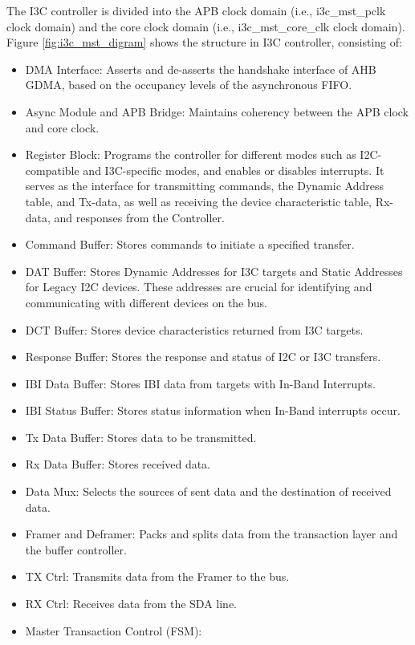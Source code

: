 \documentclass[main\_\_EN.tex]{subfiles}
\begin{document}
The I3C controller is divided into the APB clock domain (i.e., i3c\_mst\_pclk clock domain) and the core clock domain (i.e., i3c\_mst\_core\_clk clock domain). Figure \ref{fig:i3c_mst_digram} shows the structure in \chipname{} I3C controller, consisting of:

\begin{itemize}
    \item DMA Interface: Asserts and de-asserts the handshake interface of AHB GDMA, based on the occupancy levels of the asynchronous FIFO.
    \item Async Module and APB Bridge: Maintains coherency between the APB clock and core clock.
    \item Register Block: Programs the controller for different modes such as I2C-compatible and I3C-specific modes, and enables or disables interrupts. It serves as the interface for transmitting commands, the Dynamic Address table, and Tx-data, as well as receiving the device characteristic table, Rx-data, and responses from the Controller.
    \item Command Buffer: Stores commands to initiate a specified transfer.
    \item DAT Buffer: Stores Dynamic Addresses for I3C targets and Static Addresses for Legacy I2C devices. These addresses are crucial for identifying and communicating with different devices on the bus.
    \item DCT Buffer: Stores device characteristics returned from I3C targets.
    \item Response Buffer: Stores the response and status of I2C or I3C transfers.
    \item IBI Data Buffer: Stores IBI data from targets with In-Band Interrupts.
    \item IBI Status Buffer: Stores status information when In-Band interrupts occur.
    \item Tx Data Buffer: Stores data to be transmitted.
    \item Rx Data Buffer: Stores received data.
    \item Data Mux: Selects the sources of sent data and the destination of received data.
    \item Framer and Deframer: Packs and splits data from the transaction layer and the buffer controller.
    \item TX Ctrl: Transmits data from the Framer to the bus.
    \item RX Ctrl: Receives data from the SDA line.
    \item Master Transaction Control (FSM):

\end{itemize}
\end{document}
